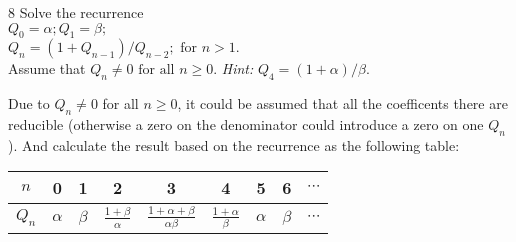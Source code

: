 \documentclass[a4paper,12pt]{article}
\makeatletter
\newtheorem*{solution}{Solution}
\theoremstyle{definition}
\renewenvironment{solution}[1][Solution] {\par\pushQED{\qed}\normalfont\topsep6\p@\@plus6\p@\relax\trivlist\item[\hskip\labelsep\bfseries#1\@addpunct{.}]\ignorespaces}{\popQED\endtrivlist\@endpefalse} \makeatother
\newenvironment{problems}{\begin{list}{}{\renewcommand{\makelabel}[1]{\textbf{##1}\hfil}}}{\end{list}}
\makeatother
\begin{document}
\begin{problems}
    \item[8] Solve the recurrence\\
    $Q_0 = \alpha ; Q_1 = \beta ;$\\
    $Q_n = (1 + Q_{n-1})/Q_{n-2} ; \text{ for } n > 1.$\\
    Assume that $Q_n \neq 0 \text{ for all } n \geq 0.$ \emph{Hint:} $Q_4 = (1 + \alpha)/\beta.$

    \begin{solution}
        Due to $Q_n\neq 0$ for all $n\geq 0$, it could be assumed that all the coefficents there are reducible (otherwise a zero on the denominator could introduce a zero on one $Q_n$). And calculate the result based on the recurrence as the following table:

        \begin{tabular}[H]{c|c|c|c|c|c|c|c|c}
            $n$ & 0 & 1 & 2 & 3 & 4 & 5 & 6 & $\cdots$\\
            \hline
            $Q_n$ & $\alpha$ & $\beta$ & $\frac{1+\beta}{\alpha}$ & $\frac{1+\alpha+\beta}{\alpha\beta}$ & $\frac{1+\alpha}{\beta}$ & $\alpha$ & $\beta$ & $\cdots$
        \end{tabular}
        

\end{solution}
\end{problems}
\end{document}
